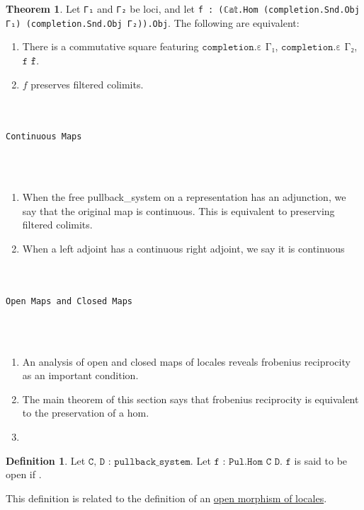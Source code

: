 \documentclass{book}
\theoremstyle{definition}
\newtheorem{definition}{Definition}
\newtheorem{theorem}{Theorem}
\renewcommand{\chapter}[1]{
\newpage
{
\Huge 
\begin{center}
\ \\
\ \\
\thispagestyle{empty}
\texttt{#1}
\end{center}}
\ \\
\ \\
}
\begin{document}
\begin{theorem}
Let \texttt{Γ₁} and \texttt{Γ₂} be loci, and let \texttt{f : (ℂ𝕒𝕥.Hom (completion.Snd.Obj Γ₁) (completion.Snd.Obj Γ₂)).Obj}. The following are equivalent:
\begin{enumerate}
\item There is a commutative square featuring $\texttt{completion.ε Γ₁}$, $\texttt{completion.ε Γ₂}$, $\texttt{f}$ $\texttt{f̂}$.
\item $f$ preserves filtered colimits.
\end{enumerate}
\end{theorem}

\chapter{Continuous Maps}

\begin{enumerate}
\item When the free pullback_system on a representation has an adjunction, we say that the original map is continuous. This is equivalent to preserving filtered colimits.
\item When a left adjoint has a continuous right adjoint, we say it is continuous
\end{enumerate}

\chapter{Open Maps and Closed Maps}

\begin{enumerate}
\item An analysis of open and closed maps of locales reveals frobenius reciprocity as an important condition.
\item The main theorem of this section says that frobenius reciprocity is equivalent to the preservation of a hom.
\item 
\end{enumerate}

\begin{definition}
Let $\texttt{C, D : pullback\_system}$. Let $\texttt{f : Pul.Hom C D}$. $\texttt{f}$ is said to be open if . 
\end{definition}



This definition is related to the definition of an \href{https://ncatlab.org/nlab/show/open+morphism}{open morphism of locales}.
\end{document}
